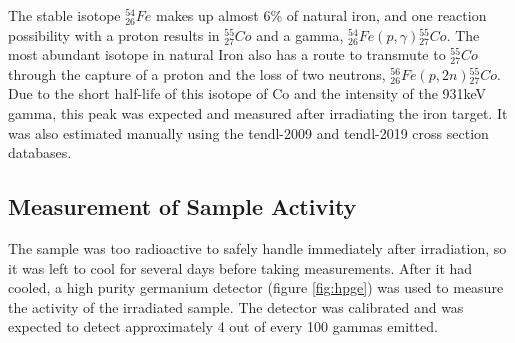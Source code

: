 \FloatBarrier

The stable isotope ${}^{54}_{26} Fe$  makes up almost 6\% of natural iron, and one reaction possibility with a proton results in ${}^{55}_{27} Co$ and a gamma, ${}^{54}_{26} Fe (p, \gamma) {}^{55}_{27} Co$.  The most abundant isotope in natural Iron also has a route to transmute to ${}^{55}_{27} Co$ through the capture of a proton and the loss of two neutrons, ${}^{56}_{26} Fe (p, 2n) {}^{55}_{27} Co$.  Due to the short half-life of this isotope of \Gls{Co} and the intensity of the 931keV gamma, this peak was expected and measured after irradiating the iron target.  It was also estimated manually using the \acrshort{tendl}-2009 and \acrshort{tendl}-2019 cross section databases.




\subsection{Measurement of Sample Activity}

The sample was too radioactive to safely handle immediately after irradiation, so it was left to cool for several days before taking measurements.  After it had cooled, a high purity germanium detector (figure \ref{fig:hpge}) was used to measure the activity of the irradiated sample.  The detector was calibrated and was expected to detect approximately 4 out of every 100 gammas emitted.  

